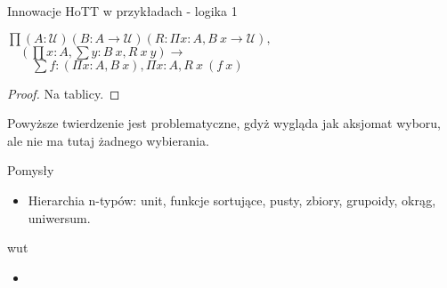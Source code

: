\documentclass{beamer}
\begin{document}
\begin{frame}{Innowacje HoTT w przykładach - logika 1}
\begin{theorem}
$\textstyle \prod (A : \mathcal{U}) (B : A \to \mathcal{U}) (R : \Pi x : A, B\ x \to \mathcal{U}),$ \\
	$\textstyle \quad (\prod x : A, \sum y : B\ x, R\ x\ y) \to$ \\
		$\textstyle \qquad \sum f : (\Pi x : A, B\ x), \Pi x : A, R\ x\ (f\ x)$
\end{theorem}
\begin{proof}
	Na tablicy.
\end{proof}

Powyższe twierdzenie jest problematyczne, gdyż wygląda jak aksjomat wyboru, ale nie ma tutaj żadnego wybierania.

\end{frame}

\begin{frame}{Pomysły}
\begin{itemize}
	\item Hierarchia n-typów: unit, funkcje sortujące, pusty, zbiory, grupoidy, okrąg, uniwersum.
	
\end{itemize}
\end{frame}

\begin{frame}{wut}
\begin{itemize}
	\item
\end{itemize}
\end{frame}
\end{document}
